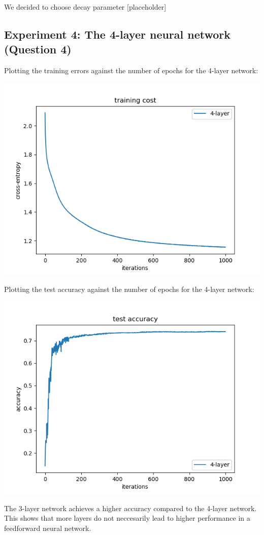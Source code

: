 We decided to choose decay parameter [placeholder]

\subsection*{Experiment 4: The 4-layer neural network (Question 4)}

Plotting the training errors against the number of epochs for the 4-layer
network:

\begin{center}
    \includegraphics[width=\imgw]{images/p1a5_4-layer_cost.png}   
\end{center}

Plotting the test accuracy against the number of epochs for the 4-layer
network:

\begin{center}
    \includegraphics[width=\imgw]{images/p1a5_4-layer_accuracy.png}   
\end{center}

The 3-layer network achieves a higher accuracy compared to the 4-layer
network. This shows that more layers do not neccesarily lead to higher
performance in a feedforward neural network.
